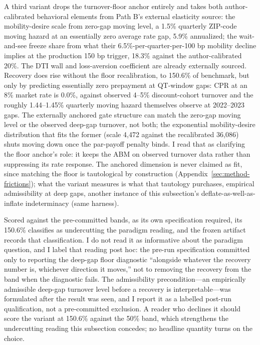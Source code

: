 A third variant drops the turnover-floor anchor entirely and takes both author-calibrated behavioral elements from Path B's external elasticity source: the mobility-desire scale from  zero-gap moving level, a 1.5\% quarterly ZIP-code moving hazard at an essentially zero average rate gap, 5.9\% annualized; the wait-and-see freeze share from what their 6.5\%-per-quarter-per-100 bp mobility decline implies at the production 150 bp trigger, 18.3\% against the author-calibrated 20\%. The DTI wall and loss-aversion coefficient are already externally sourced. Recovery does rise without the floor recalibration, to 150.6\% of benchmark, but only by predicting essentially zero prepayment at QT-window gaps: CPR at an 8\% market rate is 0.0\%, against observed 4--5\% discount-cohort turnover and the roughly 1.44--1.45\% quarterly moving hazard \citet{liebersohn2024} themselves observe at 2022--2023 gaps. The externally anchored gate structure can match the zero-gap moving level or the observed deep-gap turnover, not both; the exponential mobility-desire distribution that fits the former (scale 4{,}472 against the recalibrated 36{,}086) shuts moving down once the par-payoff penalty binds. I read that as clarifying the floor anchor's role: it keeps the ABM on observed turnover data rather than suppressing its rate response. The anchored dimension is never claimed as fit, since matching the floor is tautological by construction (Appendix~\ref{sec:method-frictions}); what the variant measures is what that tautology purchases, empirical admissibility at deep gaps, another instance of this subsection's deflate-as-well-as-inflate indeterminacy (same harness).

Scored against the pre-committed bands, as its own specification required, its 150.6\% classifies as undercutting the paradigm reading, and the frozen artifact records that classification. I do not read it as informative about the paradigm question, and I label that reading post hoc: the pre-run specification committed only to reporting the deep-gap floor diagnostic ``alongside whatever the recovery number is, whichever direction it moves,'' not to removing the recovery from the band when the diagnostic fails. The admissibility precondition---an empirically admissible deep-gap turnover level before a recovery is interpretable---was formulated after the result was seen, and I report it as a labelled post-run qualification, not a pre-committed exclusion. A reader who declines it should score the variant at 150.6\% against the 50\% band, which strengthens the undercutting reading this subsection concedes; no headline quantity turns on the choice.

